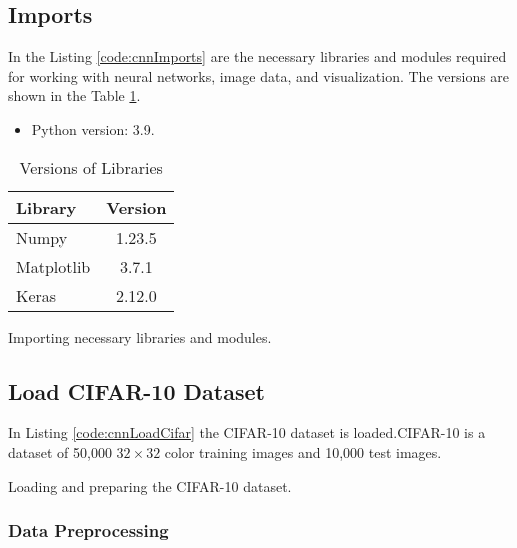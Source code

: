 \subsection{Imports}

In the Listing \ref{code:cnnImports} are the necessary libraries and modules required for working with neural networks, image data, and visualization. The versions are shown in the Table \ref{tab:cnnlibraryVersions}.

\begin{itemize}
	\item Python version: 3.9.
\end{itemize}

\begin{table}[htbp]
	\centering
	\caption{Versions of Libraries}
	\label{tab:cnnlibraryVersions}
	\begin{tabular}{|l|c|}
		\hline
		\textbf{Library} & \textbf{Version} \\
		\hline
		Numpy & 1.23.5 \\
		Matplotlib & 3.7.1 \\
		Keras & 2.12.0 \\
		\hline
	\end{tabular}
\end{table}

\begin{code}[h!]
	    
	
	\caption{Importing necessary libraries and modules.}
	\label{code:cnnImports}
\end{code}

\subsection{Load CIFAR-10 Dataset}

In Listing \ref{code:cnnLoadCifar} the CIFAR-10 dataset is loaded.CIFAR-10 is a dataset of 50,000 $32 \times 32$ color training images and 10,000 test images.

\begin{code}[h!]
	    
	
	\caption{Loading and preparing the CIFAR-10 dataset.}
	\label{code:cnnLoadCifar}
\end{code}

\subsubsection{Data Preprocessing}

